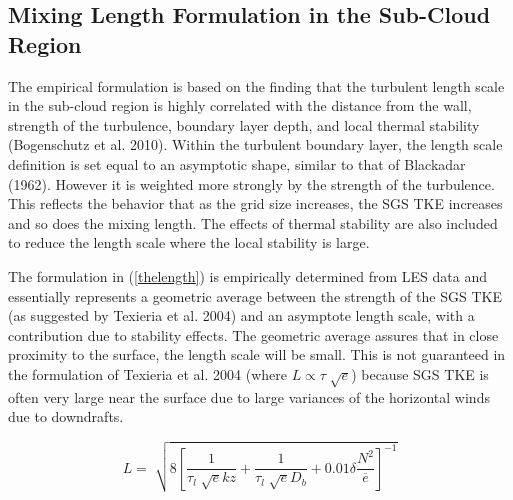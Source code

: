 \documentclass[12pt,titlepage]{article}
\numberwithin{equation}{section}
\begin{document}
\subsection{Mixing Length Formulation in the Sub-Cloud Region}

The empirical formulation is based on the finding that the turbulent length scale in the sub-cloud region is highly correlated with the distance from the wall, strength of the turbulence, boundary layer depth, and local thermal stability (Bogenschutz et al. 2010).  Within the turbulent boundary layer, the length scale definition is set equal to an asymptotic shape, similar to that of Blackadar (1962).  However it is weighted more strongly by the strength of the turbulence.  This reflects the behavior that as the grid size increases, the SGS TKE increases and so does the mixing length.  The effects of thermal stability are also included to reduce the length scale where the local stability is large.  

The formulation in (\ref{thelength}) is empirically determined from LES data and essentially represents a geometric average between the strength of the SGS TKE (as suggested by Texieria et al. 2004) and an asymptote length scale, with a contribution due to stability effects.  The geometric average assures that in close proximity to the surface, the length scale will be small.  This is not guaranteed in the formulation of Texieria et al. 2004 (where $L \propto \tau \sqrt[]{e}$) because SGS TKE is often very large near the surface due to large variances of the horizontal winds due to downdrafts.         

\begin{equation}
  L=\sqrt[]{8\left[\frac{1}{\tau_{l}\sqrt[]{e}kz}+\frac{1}{\tau_{l}\sqrt[]{e}D_{b}}+0.01\delta\frac{N^{2}}{\overline{e}}\right]^{-1}}
  \label{thelength}
\end{equation}
\end{document}
